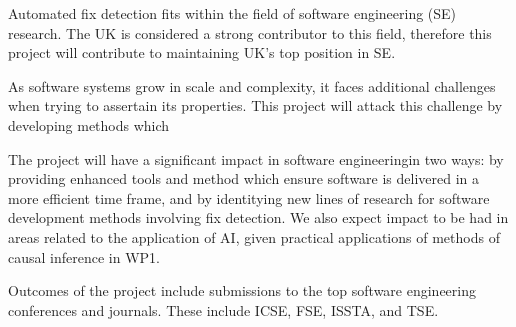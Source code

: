 Automated fix detection fits within the field of software engineering (SE) research. The UK is considered a strong contributor to this field, therefore this project will contribute to maintaining UK's top position in SE. 

As software systems grow in scale and complexity, it faces additional challenges when trying to assertain its properties. This project will attack this challenge by developing methods which 

The project will have a significant impact in software engineeringin two ways: by providing enhanced tools and method which ensure software is delivered in a more efficient time frame, and by identitying new lines of research for software development methods involving fix detection. We also expect impact to be had in areas related to the application of AI, given practical applications of methods of causal inference in WP1. 

Outcomes of the project include submissions to the top software engineering conferences and journals. These include ICSE, FSE, ISSTA, and TSE.  
